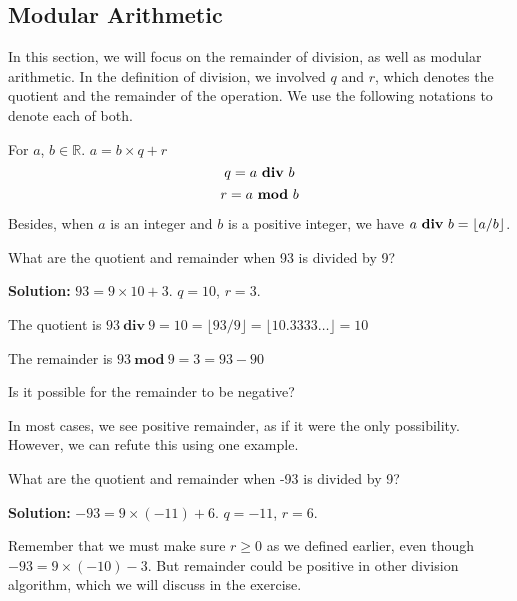     \subsection{Modular Arithmetic}
    In this section, we will focus on the remainder of division, as well as modular arithmetic.
    In the definition of division, we involved $q$ and $r$, which denotes the quotient and
    the remainder of the operation. We use the following notations to denote each of both.
    \begin{notation}
        For $a$, $b\in \mathbb{R}$.
        $a = b\times q + r$    
        $$q = a\ \text{\textbf{div}}\ b$$
        $$r = a\ \text{\textbf{mod}}\ b$$
    \end{notation}
    Besides, when $a$ is an integer and $b$ is a positive integer, we have $a\ \text{\textbf{div}}\ b = \left \lfloor  a/b \right \rfloor$.
    \begin{example}
        What are the quotient and remainder when 93 is divided by 9?
    \end{example}
    \textbf{Solution:} $93 = 9\times 10 + 3$. $q = 10$, $r = 3$.

    The quotient is $93\ \textbf{div}\ 9 = 10 = \lfloor93/9\rfloor = \lfloor10.3333\dots \rfloor = 10$

    The remainder is $93\ \textbf{mod}\ 9 = 3 = 93 - 90$
    \begin{problem}
        Is it possible for the remainder to be negative?
    \end{problem}
    In most cases, we see positive remainder, as if it were the only possibility. However, we can
    refute this using one example.
    \begin{example}
        What are the quotient and remainder when -93 is divided by 9?
    \end{example}
    \textbf{Solution:} $-93 = 9\times (-11) + 6$. $q = -11$, $r = 6$.
    
    Remember that we must make sure $r\geq0$ as we defined earlier, even though $-93 = 9\times(-10) - 3$.
    But remainder could be positive in other division algorithm, which we will discuss in the exercise.

